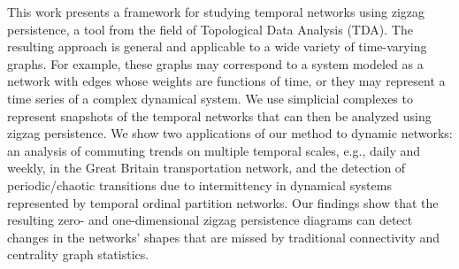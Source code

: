 %
%
%
This work presents a framework for studying temporal networks using zigzag persistence, a tool from the field of Topological Data Analysis (TDA). 
The resulting approach is general and applicable to a wide variety of time-varying graphs. For example, these graphs may correspond to a system modeled as a network with edges whose weights are functions of time, or they may represent a time series of a complex dynamical system. 
We use simplicial complexes to represent snapshots of the temporal networks that can then be analyzed using zigzag persistence. 
We show two applications of our method to dynamic networks: an analysis of commuting trends on multiple temporal scales, e.g., daily and weekly, in the Great Britain transportation network, and the detection of periodic/chaotic transitions due to intermittency in dynamical systems represented by temporal ordinal partition networks. 
Our findings show that the resulting zero- and one-dimensional zigzag persistence diagrams can detect changes in the networks' shapes that are missed by traditional connectivity and centrality graph statistics.

